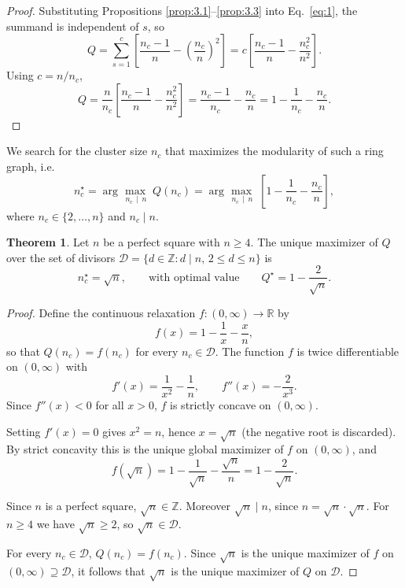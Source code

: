\documentclass[12pt]{article}
\theoremstyle{definition}
\newtheorem{theorem}{Theorem}
\begin{document}
\begin{proof}
  Substituting Propositions \ref{prop:3.1}--\ref{prop:3.3} into Eq.~\ref{eq:1}, the summand is independent of $s$, so
  \[
    Q = \sum_{s=1}^{c} \left[ \frac{n_c - 1}{n} - \left(\frac{n_c}{n}\right)^2 \right] = c \left[ \frac{n_c - 1}{n} - \frac{n_c^2}{n^2} \right].
  \]
  Using $c = n/n_c$,
  \[
    Q = \frac{n}{n_c}\left[\frac{n_c - 1}{n} - \frac{n_c^2}{n^2}\right] = \frac{n_c - 1}{n_c} - \frac{n_c}{n} = 1 - \frac{1}{n_c} - \frac{n_c}{n}.
  \]
\end{proof}

We search for the cluster size $n_c$ that maximizes the modularity of such a ring graph, i.e.
\[
  n_c^{\star} = \arg\max_{\,n_c \,\mid\, n}\; Q(n_c) = \arg\max_{\,n_c \,\mid\, n}\;\left[1 - \frac{1}{n_c} - \frac{n_c}{n}\right],
\]
where $n_c \in \{2, \ldots, n\}$ and $n_c \mid n$.

\begin{theorem}
  \label{thm:3.5}
  Let $n$ be a perfect square with $n \geq 4$. The unique maximizer of $Q$ over the set of divisors $\mathcal{D} = \{d \in \mathbb{Z} : d \mid n,\, 2 \leq d \leq n\}$ is
  \[
    n_c^{\star} = \sqrt{n}, \qquad \text{with optimal value} \qquad Q^{\star} = 1 - \frac{2}{\sqrt{n}}.
  \]
\end{theorem}

\begin{proof}
  Define the continuous relaxation $f : (0, \infty) \to \mathbb{R}$ by
  \[
    f(x) = 1 - \frac{1}{x} - \frac{x}{n},
  \]
  so that $Q(n_c) = f(n_c)$ for every $n_c \in \mathcal{D}$. The function $f$ is twice differentiable on $(0, \infty)$ with
  \[
    f'(x) = \frac{1}{x^2} - \frac{1}{n}, \qquad f''(x) = -\frac{2}{x^3}.
  \]
  Since $f''(x) < 0$ for all $x > 0$, $f$ is strictly concave on $(0, \infty)$.

  \noindent
  Setting $f'(x) = 0$ gives $x^2 = n$, hence $x = \sqrt{n}$ (the negative root is discarded). By strict concavity this is the unique global maximizer of $f$ on $(0, \infty)$, and
  \[
    f(\sqrt{n}) = 1 - \frac{1}{\sqrt{n}} - \frac{\sqrt{n}}{n} = 1 - \frac{2}{\sqrt{n}}.
  \]

  \noindent
  Since $n$ is a perfect square, $\sqrt{n} \in \mathbb{Z}$. Moreover $\sqrt{n} \mid n$, since $n = \sqrt{n} \cdot \sqrt{n}$. For $n \geq 4$ we have $\sqrt{n} \geq 2$, so $\sqrt{n} \in \mathcal{D}$.

  \noindent
  For every $n_c \in \mathcal{D}$, $Q(n_c) = f(n_c)$. Since $\sqrt{n}$ is the unique maximizer of $f$ on $(0, \infty) \supseteq \mathcal{D}$, it follows that $\sqrt{n}$ is the unique maximizer of $Q$ on $\mathcal{D}$.
\end{proof}
\end{document}
